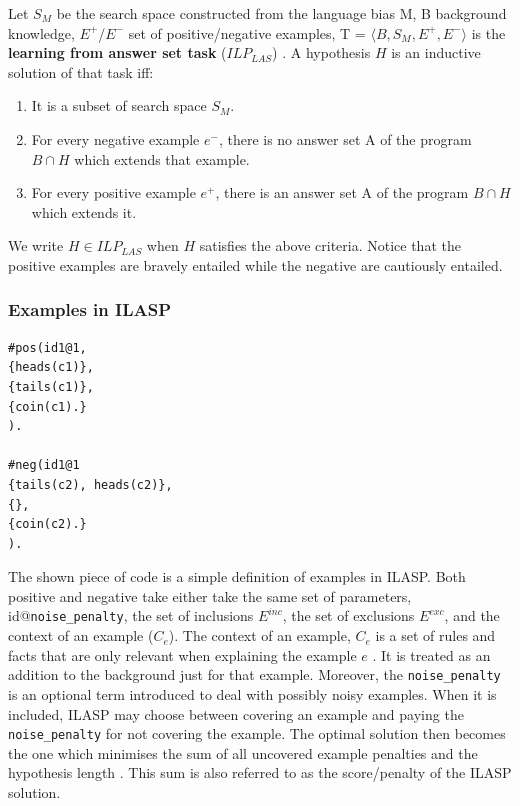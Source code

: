 Let $S_M$ be the search space constructed from the language bias M, B background knowledge, $E^+$/$E^-$ set of positive/negative examples, T = $\langle B, S_M, E^+, E^- \rangle$ is the \textbf{learning from answer set task} ($ILP_{LAS}$) \cite{RefWorks:RefID:47-law2014inductive}.
A hypothesis $H$ is an inductive solution of that task iff:
\begin{enumerate}
    \item It is a subset of search space $S_M$.
    \item For every negative example $e^-$, there is no answer set A of the program $B \cap H$ which extends that example.
    \item For every positive example $e^+$, there is an answer set A of the program $B \cap H$ which extends it.
\end{enumerate}

We write $H \in ILP_{LAS}$ when $H$ satisfies the above criteria.
Notice that the positive examples are bravely entailed while the negative are cautiously entailed.

\subsubsection{Examples in ILASP}
\label{examples-in-ilasp}

\begin{verbatim}
#pos(id1@1,
{heads(c1)},
{tails(c1)},
{coin(c1).}
).

#neg(id1@1
{tails(c2), heads(c2)},
{},
{coin(c2).}
).
\end{verbatim}

The shown piece of code is a simple definition of examples in ILASP. 
Both positive and negative take either take the same set of parameters, id@\verb+noise_penalty+, the set of inclusions $E^{inc}$, the set of exclusions $E^{exc}$, and the context of an example ($C_e$).
The context of an example, $C_e$ is a set of rules and facts that are only relevant when explaining the example $e$ \cite{RefWorks:RefID:56-broda2016iterative}.
It is treated as an addition to the background just for that example.
Moreover, the \verb+noise_penalty+ is an optional term introduced to deal with possibly noisy examples. 
When it is included, ILASP may choose between covering an example and paying the \verb+noise_penalty+ for not covering the example.
The optimal solution then becomes the one which minimises the sum of all uncovered example penalties and the hypothesis length \cite{RefWorks:RefID:83-law2018inductive}.
This sum is also referred to as the score/penalty of the ILASP solution.

